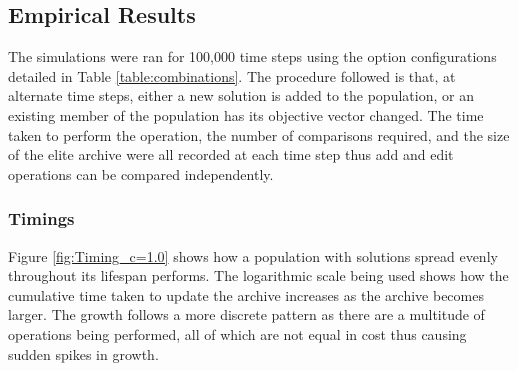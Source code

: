 \documentclass{ecmm427_assignment}
\begin{document}
\subsection{Empirical Results}
The simulations were ran for 100,000 time steps using the option configurations detailed in Table \ref{table:combinations}. The procedure followed is that, at alternate time steps, either a new solution is added to the population, or an existing member of the population has its objective vector changed. The time taken to perform the operation, the number of comparisons required, and the size of the elite archive were all recorded at each time step thus add and edit operations can be compared independently.\\

\subsubsection{Timings}
Figure \ref{fig:Timing_c=1.0} shows how a population with solutions spread evenly throughout its lifespan performs. The logarithmic scale being used shows how the cumulative time taken to update the archive increases as the archive becomes larger. The growth follows a more discrete pattern as there are a multitude of operations being performed, all of which are not equal in cost thus causing sudden spikes in growth.
\end{document}

